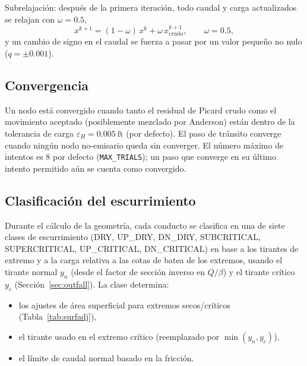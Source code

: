 \documentclass[11pt,a4paper]{article}
\newcommand{\ft}{\mathrm{ft}}
\begin{document}
Subrelajación: después de la primera iteración, todo caudal y carga
actualizados se relajan con $\omega = 0.5$,
\begin{equation}
  x^{k+1} = (1-\omega)\,x^{k} + \omega\,x^{k+1}_{\mathrm{crudo}},
  \qquad \omega = 0.5,
\end{equation}
y un cambio de signo en el caudal se fuerza a pasar por un valor pequeño no
nulo ($q = \pm 0.001$).

\subsection{Convergencia}

Un nodo está convergido cuando tanto el residual de Picard crudo como el
movimiento aceptado (posiblemente mezclado por Anderson) están dentro de la
tolerancia de carga $\varepsilon_H = 0.005\ \ft$ (por defecto). El paso de
tránsito converge cuando ningún nodo no-emisario queda sin converger. El número
máximo de intentos es 8 por defecto (\texttt{MAX\_TRIALS}); un paso que
converge en su último intento permitido aún se cuenta como convergido.

\subsection{Clasificación del escurrimiento}

Durante el cálculo de la geometría, cada conducto se clasifica en una de siete
clases de escurrimiento (DRY, UP\_DRY, DN\_DRY, SUBCRITICAL, SUPERCRITICAL,
UP\_CRITICAL, DN\_CRITICAL) en base a los tirantes de extremo y a la carga
relativa a las cotas de batea de los extremos, usando el tirante normal $y_n$
(desde el factor de sección inverso en $Q/\beta$) y el tirante crítico $y_c$
(Sección~\ref{sec:outfall}). La clase determina:
\begin{itemize}[nosep]
  \item los ajustes de área superficial para extremos secos/críticos
        (Tabla~\ref{tab:surfadj}),
  \item el tirante usado en el extremo crítico (reemplazado por
        $\min(y_n, y_c)$),
  \item el límite de caudal normal basado en la fricción.
\end{itemize}
\end{document}
